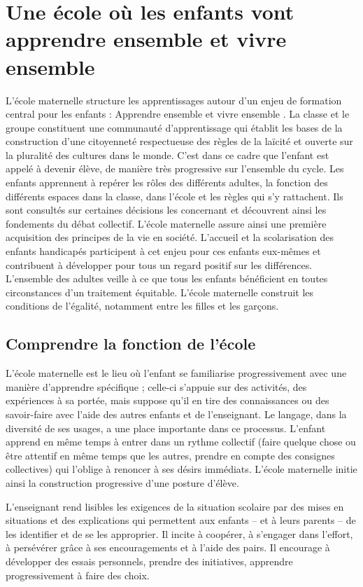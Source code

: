 \chapter{Une école où les enfants vont apprendre ensemble et vivre ensemble}
L’école maternelle structure les apprentissages autour d’un enjeu de formation central pour les enfants : \og Apprendre ensemble et vivre ensemble \fg{}. La classe et le groupe constituent une communauté d’apprentissage qui établit les bases de la construction d’une citoyenneté respectueuse des règles de la laïcité et ouverte sur la pluralité des cultures dans le monde. C’est dans ce cadre que l’enfant est appelé à devenir élève, de manière très progressive sur l’ensemble du cycle. Les enfants apprennent à repérer les rôles des différents adultes, la fonction des différents espaces dans la classe, dans l’école et les règles qui s’y rattachent. Ils sont consultés sur certaines décisions les concernant et découvrent ainsi les fondements du débat collectif. L’école maternelle assure ainsi une première acquisition des principes de la vie en société. L’accueil et la scolarisation des enfants handicapés participent à cet enjeu pour ces enfants eux-mêmes et contribuent à développer pour tous un regard positif sur les différences. L’ensemble des adultes veille à ce que tous les enfants bénéficient en toutes circonstances d'un traitement équitable. L’école maternelle construit les conditions de l’égalité, notamment entre les filles et les garçons. 

\section{Comprendre la fonction de l’école}
L’école maternelle est le lieu où l’enfant se familiarise progressivement avec une manière d’apprendre spécifique ; celle-ci s’appuie sur des activités, des expériences à sa portée, mais suppose qu’il en tire des connaissances ou des savoir-faire avec l’aide des autres enfants et de l’enseignant. Le langage, dans la diversité de ses usages, a une place importante dans ce processus. L’enfant apprend en même temps à entrer dans un rythme collectif (faire quelque chose ou être attentif en même temps que les autres, prendre en compte des consignes collectives) qui l’oblige à renoncer à ses désirs immédiats. L’école maternelle initie ainsi la construction progressive d’une posture d’élève. 

L’enseignant rend lisibles les exigences de la situation scolaire par des mises en situations et des explications qui permettent aux enfants -- et à leurs parents -- de les identifier et de se les approprier. Il incite à coopérer, à s’engager dans l’effort, à persévérer grâce à ses encouragements et à l’aide des pairs. Il encourage à développer des essais personnels, prendre des initiatives, apprendre progressivement à faire des choix.

